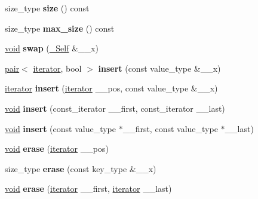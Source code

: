 \begin{DoxyCompactItemize}
\item 
\mbox{\label{classset_ae1202b4dbfa38fa9991975e2f8f6c5dc}} 
size\+\_\+type {\bfseries size} () const
\item 
\mbox{\label{classset_a3f3d228fef866fda90b4e314e0de122d}} 
size\+\_\+type {\bfseries max\+\_\+size} () const
\item 
\mbox{\label{classset_ad24467dd7e09610db47016305d6b5617}} 
\hyperlink{interfacevoid}{void} {\bfseries swap} (\hyperlink{classset}{\+\_\+\+Self} \&\+\_\+\+\_\+x)
\item 
\mbox{\label{classset_a90bef3ebc1fa511ebcc4153e6a7d67d7}} 
\hyperlink{structpair}{pair}$<$ \hyperlink{structiterator}{iterator}, bool $>$ {\bfseries insert} (const value\+\_\+type \&\+\_\+\+\_\+x)
\item 
\mbox{\label{classset_a4b15c183176088ca4edda7a3c7905671}} 
\hyperlink{structiterator}{iterator} {\bfseries insert} (\hyperlink{structiterator}{iterator} \+\_\+\+\_\+pos, const value\+\_\+type \&\+\_\+\+\_\+x)
\item 
\mbox{\label{classset_a7155d17c35d5d0a0d635100cc52b1664}} 
\hyperlink{interfacevoid}{void} {\bfseries insert} (const\+\_\+iterator \+\_\+\+\_\+first, const\+\_\+iterator \+\_\+\+\_\+last)
\item 
\mbox{\label{classset_aef6025de65406f72d35e85f5b686b0c7}} 
\hyperlink{interfacevoid}{void} {\bfseries insert} (const value\+\_\+type $\ast$\+\_\+\+\_\+first, const value\+\_\+type $\ast$\+\_\+\+\_\+last)
\item 
\mbox{\label{classset_a5cd2e838cef13a0ba4254d571f2f005b}} 
\hyperlink{interfacevoid}{void} {\bfseries erase} (\hyperlink{structiterator}{iterator} \+\_\+\+\_\+pos)
\item 
\mbox{\label{classset_af22549a1c71d4ff2799a80de1c2550c2}} 
size\+\_\+type {\bfseries erase} (const key\+\_\+type \&\+\_\+\+\_\+x)
\item 
\mbox{\label{classset_a0eb060827564738597193ab7409b8a5d}} 
\hyperlink{interfacevoid}{void} {\bfseries erase} (\hyperlink{structiterator}{iterator} \+\_\+\+\_\+first, \hyperlink{structiterator}{iterator} \+\_\+\+\_\+last)

\end{DoxyCompactItemize}
